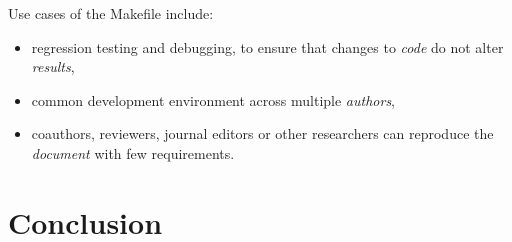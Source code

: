 \documentclass[journal]{IEEEtran}
\begin{document}
Use cases of the Makefile include:
\begin{itemize}
	\item regression testing and debugging, to ensure that changes to \textit{code} do not alter \textit{results},
	\item common development environment across multiple \textit{authors},
	\item coauthors, reviewers, journal editors or other researchers can reproduce the \textit{document} with few requirements.
\end{itemize}

\section*{Conclusion}



\end{document}
